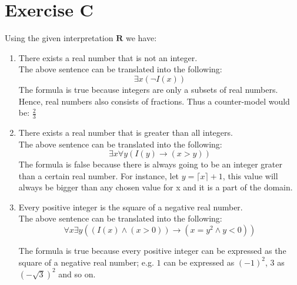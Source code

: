 \section{Exercise C}
Using the given interpretation $\mathbf{R}$ we have:
\begin{enumerate}
\item There exists a real number that is not an integer. \\
The above sentence can be translated into the following: 
\[ \exists x (\neg I(x))\]
The formula is true because integers are only a subsets of real numbers. Hence, real numbers also consists of fractions. Thus a counter-model would be: $\frac{2}{3}$ \\

\item There exists a real number that is greater than all integers. \\
The above sentence can be translated into the following: 
\[\exists x \forall y (I(y) \to (x > y))\]
The formula is false because there is always going to be an integer grater than a certain real number. For instance, let $y = \lceil x \rceil + 1$, this value will always be bigger than any chosen value for x and it is a part of the domain. \\

\item Every positive integer is the square of a negative real number. \\
The above sentence can be translated into the following: 
\[ \forall x \exists y ((I(x) \land (x > 0)) \to (x=y^2 \land y < 0))\]

The formula is true because every positive integer can be expressed as the square of a negative real number; e.g. $1$ can be expressed as $(-1)^2$, $3$ as $(-\sqrt{3})^2$ and so on. 
\end{enumerate}